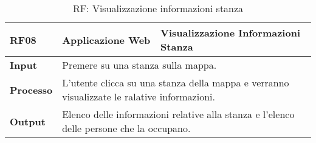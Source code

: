 \begin{table}[ht]
\caption{RF: Visualizzazione informazioni stanza}
\begin{center}
\begin{tabular}{|p{3cm}|p{4cm}|p{5cm}|}
\hline
\textbf{RF08}&\textbf{Applicazione Web}&\textbf{Visualizzazione Informazioni Stanza}\\
\hline
\textbf{Input}&\multicolumn{2}{|p{9cm}|}{Premere su una stanza sulla mappa.}\\
\hline
\textbf{Processo}&\multicolumn{2}{|p{9cm}|}{
L'utente clicca su una stanza della mappa e verranno visualizzate le ralative informazioni.
}\\
\hline
\textbf{Output}&\multicolumn{2}{|p{9cm}|}{
Elenco delle informazioni relative alla stanza e l'elenco delle persone che la occupano.
}\\
\hline
\end{tabular}
\end{center}
\label{Ricerca persone}
\end{table}


